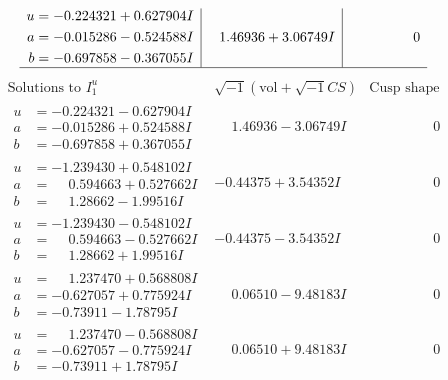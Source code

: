 \documentclass[1p]{elsarticle_modified}
\theoremstyle{definition}
\newcommand{\I}{\sqrt{-1}}
\begin{document}
$$\begin{array}{c|c|c}
\begin{aligned}
u &= -0.224321 + 0.627904 I \\
a &= -0.015286 - 0.524588 I \\
b &= -0.697858 - 0.367055 I\end{aligned}
 & \phantom{-}1.46936 + 3.06749 I & \phantom{-0.000000 } 0\\
 \hline 
 \end{array}$$\newpage$$\begin{array}{c|c|c}  
\text{Solutions to }I^u_{1}& \I (\text{vol} + \sqrt{-1}CS) & \text{Cusp shape}\\
 \hline 
\begin{aligned}
u &= -0.224321 - 0.627904 I \\
a &= -0.015286 + 0.524588 I \\
b &= -0.697858 + 0.367055 I\end{aligned}
 & \phantom{-}1.46936 - 3.06749 I & \phantom{-0.000000 } 0 \\ \hline\begin{aligned}
u &= -1.239430 + 0.548102 I \\
a &= \phantom{-}0.594663 + 0.527662 I \\
b &= \phantom{-}1.28662 - 1.99516 I\end{aligned}
 & -0.44375 + 3.54352 I & \phantom{-0.000000 } 0 \\ \hline\begin{aligned}
u &= -1.239430 - 0.548102 I \\
a &= \phantom{-}0.594663 - 0.527662 I \\
b &= \phantom{-}1.28662 + 1.99516 I\end{aligned}
 & -0.44375 - 3.54352 I & \phantom{-0.000000 } 0 \\ \hline\begin{aligned}
u &= \phantom{-}1.237470 + 0.568808 I \\
a &= -0.627057 + 0.775924 I \\
b &= -0.73911 - 1.78795 I\end{aligned}
 & \phantom{-}0.06510 - 9.48183 I & \phantom{-0.000000 } 0 \\ \hline\begin{aligned}
u &= \phantom{-}1.237470 - 0.568808 I \\
a &= -0.627057 - 0.775924 I \\
b &= -0.73911 + 1.78795 I\end{aligned}
 & \phantom{-}0.06510 + 9.48183 I & \phantom{-0.000000 } 0 \\ \hline\begin{aligned}

\end{aligned}
\end{array}$$
\end{document}

